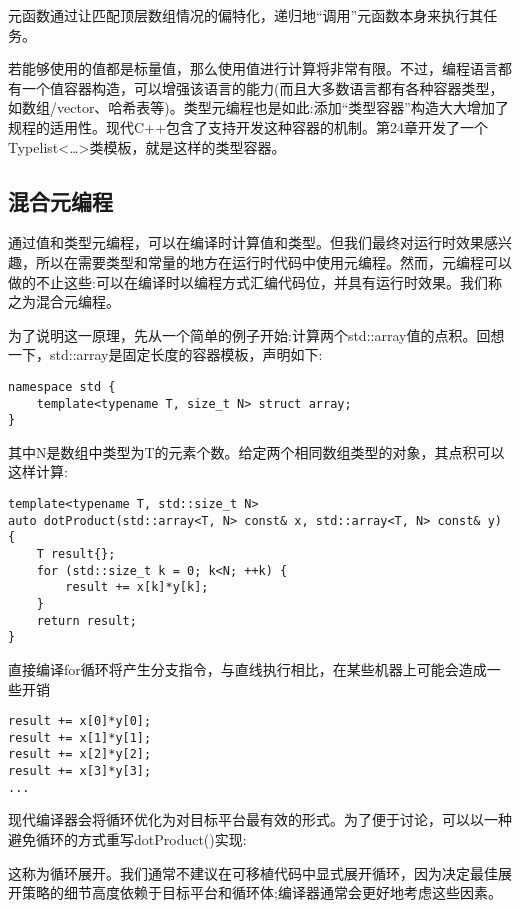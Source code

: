 元函数通过让匹配顶层数组情况的偏特化，递归地“调用”元函数本身来执行其任务。

若能够使用的值都是标量值，那么使用值进行计算将非常有限。不过，编程语言都有一个值容器构造，可以增强该语言的能力(而且大多数语言都有各种容器类型，如数组/vector、哈希表等)。类型元编程也是如此:添加“类型容器”构造大大增加了规程的适用性。现代C++包含了支持开发这种容器的机制。第24章开发了一个Typelist<…>类模板，就是这样的类型容器。

\subsection{混合元编程}

通过值和类型元编程，可以在编译时计算值和类型。但我们最终对运行时效果感兴趣，所以在需要类型和常量的地方在运行时代码中使用元编程。然而，元编程可以做的不止这些:可以在编译时以编程方式汇编代码位，并具有运行时效果。我们称之为混合元编程。

为了说明这一原理，先从一个简单的例子开始:计算两个std::array值的点积。回想一下，std::array是固定长度的容器模板，声明如下:

\begin{lstlisting}[style=styleCXX]
namespace std {
	template<typename T, size_t N> struct array;
}
\end{lstlisting}

其中N是数组中类型为T的元素个数。给定两个相同数组类型的对象，其点积可以这样计算:

\begin{lstlisting}[style=styleCXX]
template<typename T, std::size_t N>
auto dotProduct(std::array<T, N> const& x, std::array<T, N> const& y)
{
	T result{};
	for (std::size_t k = 0; k<N; ++k) {
		result += x[k]*y[k];
	}
	return result;
}
\end{lstlisting}

直接编译for循环将产生分支指令，与直线执行相比，在某些机器上可能会造成一些开销

\begin{lstlisting}[style=styleCXX]
result += x[0]*y[0];
result += x[1]*y[1];
result += x[2]*y[2];
result += x[3]*y[3];
...
\end{lstlisting}

现代编译器会将循环优化为对目标平台最有效的形式。为了便于讨论，可以以一种避免循环的方式重写dotProduct()实现:

\begin{tcolorbox}[colback=webgreen!5!white,colframe=webgreen!75!black]
\hspace*{0.75cm}这称为循环展开。我们通常不建议在可移植代码中显式展开循环，因为决定最佳展开策略的细节高度依赖于目标平台和循环体;编译器通常会更好地考虑这些因素。
\end{tcolorbox}

